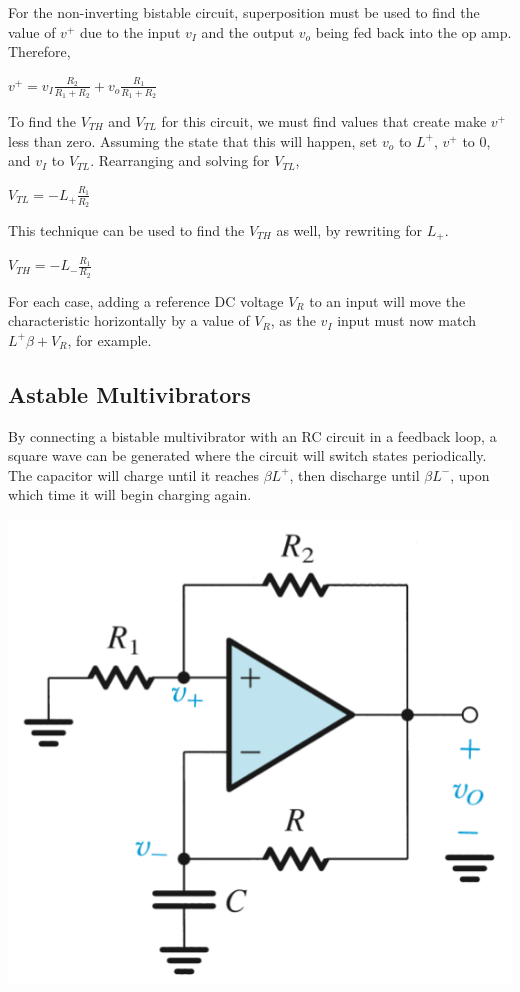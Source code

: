\documentclass[11pt]{article}
\begin{document}
    For the non-inverting bistable circuit, superposition must be used to find the value of $v^+$ due to the input $v_I$ and the output $v_o$ being fed back into the op amp. Therefore,

    \begin{center}
        $v^+ = v_I\frac{R_2}{R_1+R_2} + v_o\frac{R_1}{R_1+R_2}$
    \end{center}

    To find the $V_{TH}$ and $V_{TL}$ for this circuit, we must find values that create make $v^+$ less than zero. Assuming the state that this will happen, set $v_o$ to $L^+$, $v^+$ to $0$, and $v_I$ to $V_{TL}$. Rearranging and solving for $V_{TL}$,
    
    \begin{center}
        $V_{TL} = -L_+\frac{R_1}{R_2}$
    \end{center}

    This technique can be used to find the $V_{TH}$ as well, by rewriting for $L_+$.

    \begin{center}
        $V_{TH} = -L_-\frac{R_1}{R_2}$
    \end{center}

    For each case, adding a reference DC voltage $V_R$ to an input will move the characteristic horizontally by a value of $V_R$, as the $v_I$ input must now match $L^+\beta + V_R$, for example.
    \subsection{Astable Multivibrators}
    By connecting a bistable multivibrator with an RC circuit in a feedback loop, a square wave can be generated where the circuit will switch states periodically. The capacitor will charge until it reaches $\beta L^+$, then discharge until $\beta L^-$, upon which time it will begin charging again.

    \begin{center}
        \includegraphics[width = 250 px]{astable}        
    \end{center}
\end{document}
